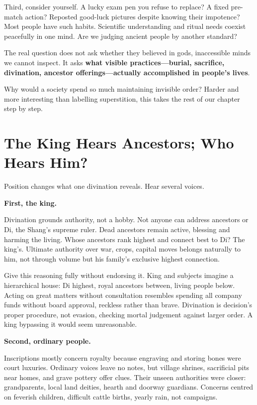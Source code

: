 Third, consider yourself. A lucky exam pen you refuse to replace? A fixed pre-match action? Reposted good-luck pictures despite knowing their impotence? Most people have such habits. Scientific understanding and ritual needs coexist peacefully in one mind. Are we judging ancient people by another standard?

The real question does not ask whether they believed in gods, inaccessible minds we cannot inspect. It asks \textbf{what visible practices---burial, sacrifice, divination, ancestor offerings---actually accomplished in people's lives}.

Why would a society spend so much maintaining invisible order? Harder and more interesting than labelling superstition, this takes the rest of our chapter step by step.

\section{The King Hears Ancestors; Who Hears Him?}
Position changes what one divination reveals. Hear several voices.

\textbf{First, the king.}

Divination grounds authority, not a hobby. Not anyone can address ancestors or Di, the Shang's supreme ruler. Dead ancestors remain active, blessing and harming the living. Whose ancestors rank highest and connect best to Di? The king's. Ultimate authority over war, crops, capital moves belongs naturally to him, not through volume but his family's exclusive highest connection.

Give this reasoning fully without endorsing it. King and subjects imagine a hierarchical house: Di highest, royal ancestors between, living people below. Acting on great matters without consultation resembles spending all company funds without board approval, reckless rather than brave. Divination is decision's proper procedure, not evasion, checking mortal judgement against larger order. A king bypassing it would seem unreasonable.

\textbf{Second, ordinary people.}

Inscriptions mostly concern royalty because engraving and storing bones were court luxuries. Ordinary voices leave no notes, but village shrines, sacrificial pits near homes, and grave pottery offer clues. Their unseen authorities were closer: grandparents, local land deities, hearth and doorway guardians. Concerns centred on feverish children, difficult cattle births, yearly rain, not campaigns.

